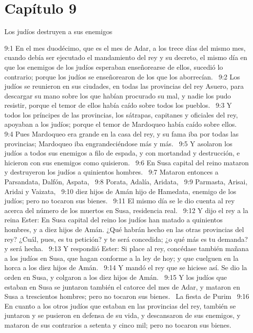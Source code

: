 \section*{Capítulo 9}
Los judíos destruyen a sus enemigos  

9:1 En el mes duodécimo, que es el mes de Adar, a los trece días del mismo mes, cuando debía ser ejecutado el mandamiento del rey y su decreto, el mismo día en que los enemigos de los judíos esperaban enseñorearse de ellos, sucedió lo contrario; porque los judíos se enseñorearon de los que los aborrecían.  
9:2 Los judíos se reunieron en sus ciudades, en todas las provincias del rey Asuero, para descargar su mano sobre los que habían procurado su mal, y nadie los pudo resistir, porque el temor de ellos había caído sobre todos los pueblos.  
9:3 Y todos los príncipes de las provincias, los sátrapas, capitanes y oficiales del rey, apoyaban a los judíos; porque el temor de Mardoqueo había caído sobre ellos.  
9:4 Pues Mardoqueo era grande en la casa del rey, y su fama iba por todas las provincias; Mardoqueo iba engrandeciéndose más y más.  
9:5 Y asolaron los judíos a todos sus enemigos a filo de espada, y con mortandad y destrucción, e hicieron con sus enemigos como quisieron.  
9:6 En Susa capital del reino mataron y destruyeron los judíos a quinientos hombres.  
9:7 Mataron entonces a Parsandata, Dalfón, Aspata,  
9:8 Porata, Adalía, Aridata,  
9:9 Parmasta, Arisai, Aridai y Vaizata,  
9:10 diez hijos de Amán hijo de Hamedata, enemigo de los judíos; pero no tocaron sus bienes.  
9:11 El mismo día se le dio cuenta al rey acerca del número de los muertos en Susa, residencia real.  
9:12 Y dijo el rey a la reina Ester: En Susa capital del reino los judíos han matado a quinientos hombres, y a diez hijos de Amán. ¿Qué habrán hecho en las otras provincias del rey? ¿Cuál, pues, es tu petición? y te será concedida; ¿o qué más es tu demanda? y será hecha.  
9:13 Y respondió Ester: Si place al rey, concédase también mañana a los judíos en Susa, que hagan conforme a la ley de hoy; y que cuelguen en la horca a los diez hijos de Amán.  
9:14 Y mandó el rey que se hiciese así. Se dio la orden en Susa, y colgaron a los diez hijos de Amán.  
9:15 Y los judíos que estaban en Susa se juntaron también el catorce del mes de Adar, y mataron en Susa a trescientos hombres; pero no tocaron sus bienes.  
La fiesta de Purim  
9:16 En cuanto a los otros judíos que estaban en las provincias del rey, también se juntaron y se pusieron en defensa de su vida, y descansaron de sus enemigos, y mataron de sus contrarios a setenta y cinco mil; pero no tocaron sus bienes.  
